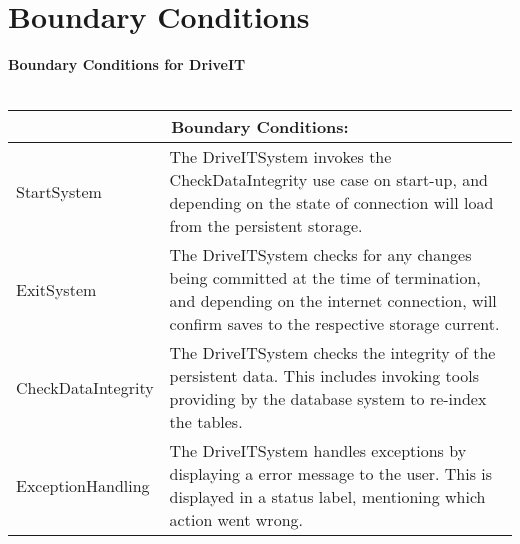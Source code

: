 \section{Boundary Conditions}

\textbf{Boundary Conditions for DriveIT}\\\\
\begin{tabular}{ | p{4cm} | p{10cm} | }
  \hline
  \multicolumn{2}{|c|}{Boundary Conditions:} \\
  \hline
    StartSystem & The DriveITSystem invokes the CheckDataIntegrity use case on start-up, and depending on the state of connection  will load from the persistent storage.\\
    \hline
    ExitSystem & The DriveITSystem checks for any changes being committed at the time of termination, and depending on the internet connection, will confirm saves to the respective storage current. \\
    \hline
    CheckDataIntegrity & The DriveITSystem checks the integrity of the persistent data. This includes invoking tools providing by the database system to re-index the tables. \\
    \hline
    ExceptionHandling & The DriveITSystem handles exceptions by displaying a error message to the user. This is displayed in a status label, mentioning which action went wrong.\\
    \hline 
\end{tabular}